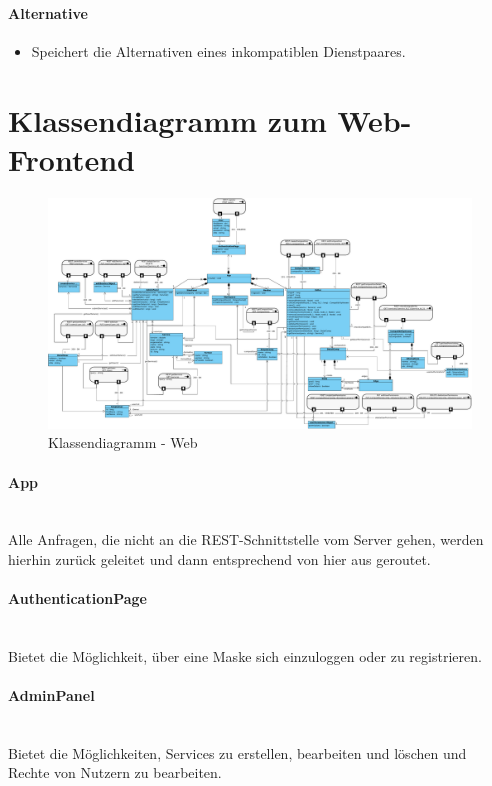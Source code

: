 \paragraph{Alternative} 
\begin{itemize}
	\item Speichert die Alternativen eines inkompatiblen Dienstpaares.
\end{itemize}

\newpage
\section*{Klassendiagramm zum Web-Frontend}

\begin{figure}[!h]
	\centering
	\includegraphics[width=\textwidth]{img/Diagramme/Klassen/Frontend}
	\caption{Klassendiagramm - Web}
	\label{fig:klassendiagramm-web}
\end{figure}

\paragraph{App}\mbox{}\\
Alle Anfragen, die nicht an die REST-Schnittstelle vom Server gehen, werden hierhin zurück geleitet
und dann entsprechend von hier aus geroutet.
\paragraph{AuthenticationPage}\mbox{}\\
Bietet die Möglichkeit, über eine Maske sich einzuloggen oder zu registrieren.
\paragraph{AdminPanel}\mbox{}\\
Bietet die Möglichkeiten, Services zu erstellen, bearbeiten und löschen und Rechte von Nutzern zu bearbeiten. 
